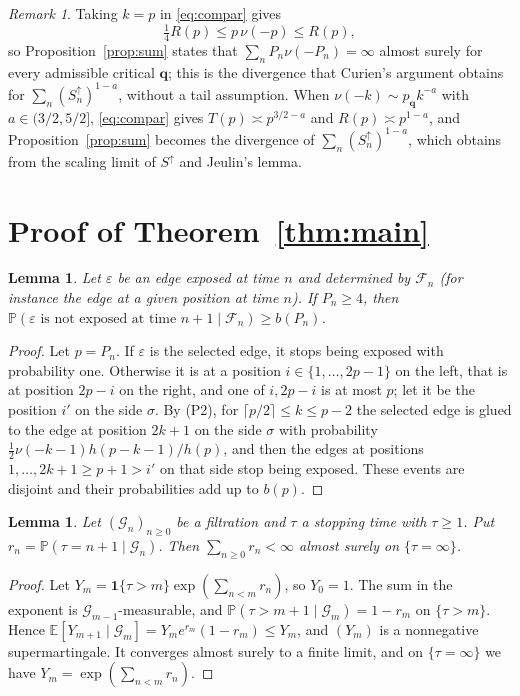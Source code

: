 \documentclass[11pt]{amsart}
\newtheorem{lemma}[theorem]{Lemma}
\theoremstyle{remark}
\newtheorem{remark}[theorem]{Remark}
\numberwithin{equation}{section}
\newcommand{\E}{\mathbb E}
\newcommand{\Pp}{\mathbb P}
\newcommand{\1}{\mathbf 1}
\newcommand{\F}{\mathcal F}
\begin{document}
\begin{remark}
Taking $k=p$ in \eqref{eq:compar} gives
\[
\tfrac14R(p)\le p\,\nu(-p)\le R(p),
\]
so Proposition~\ref{prop:sum} states that $\sum_nP_n\nu(-P_n)=\infty$ almost surely for every admissible critical $\mathbf q$; this is the divergence that Curien's argument obtains for $\sum_n(S^\uparrow_n)^{1-a}$, without a tail assumption. When $\nu(-k)\sim p_{\mathbf q}k^{-a}$ with $a\in(3/2,5/2]$, \eqref{eq:compar} gives $T(p)\asymp p^{3/2-a}$ and $R(p)\asymp p^{1-a}$, and Proposition~\ref{prop:sum} becomes the divergence of $\sum_n(S^\uparrow_n)^{1-a}$, which \cite{Cur} obtains from the scaling limit of $S^\uparrow$ and Jeulin's lemma.
\end{remark}

\section{Proof of Theorem~\ref{thm:main}}\label{sec:proof}

\begin{lemma}\label{lem:swallow}
Let $\varepsilon$ be an edge exposed at time $n$ and determined by $\F_n$ (for instance the edge at a given position at time $n$). If $P_n\ge4$, then $\Pp(\varepsilon\text{ is not exposed at time }n+1\mid\F_n)\ge b(P_n)$.
\end{lemma}

\begin{proof}
Let $p=P_n$. If $\varepsilon$ is the selected edge, it stops being exposed with probability one. Otherwise it is at a position $i\in\{1,\dots,2p-1\}$ on the left, that is at position $2p-i$ on the right, and one of $i,2p-i$ is at most $p$; let it be the position $i'$ on the side $\sigma$. By (P2), for $\lceil p/2\rceil\le k\le p-2$ the selected edge is glued to the edge at position $2k+1$ on the side $\sigma$ with probability $\frac12\nu(-k-1)h(p-k-1)/h(p)$, and then the edges at positions $1,\dots,2k+1\ge p+1>i'$ on that side stop being exposed. These events are disjoint and their probabilities add up to $b(p)$.
\end{proof}

\begin{lemma}\label{lem:hazard}
Let $(\mathcal G_n)_{n\ge0}$ be a filtration and $\tau$ a stopping time with $\tau\ge1$. Put $r_n=\Pp(\tau=n+1\mid\mathcal G_n)$. Then $\sum_{n\ge0}r_n<\infty$ almost surely on $\{\tau=\infty\}$.
\end{lemma}

\begin{proof}
Let $Y_m=\1\{\tau>m\}\exp(\sum_{n<m}r_n)$, so $Y_0=1$. The sum in the exponent is $\mathcal G_{m-1}$-measurable, and $\Pp(\tau>m+1\mid\mathcal G_m)=1-r_m$ on $\{\tau>m\}$. Hence $\E[Y_{m+1}\mid\mathcal G_m]=Y_me^{r_m}(1-r_m)\le Y_m$, and $(Y_m)$ is a nonnegative supermartingale. It converges almost surely to a finite limit, and on $\{\tau=\infty\}$ we have $Y_m=\exp(\sum_{n<m}r_n)$.
\end{proof}
\end{document}
